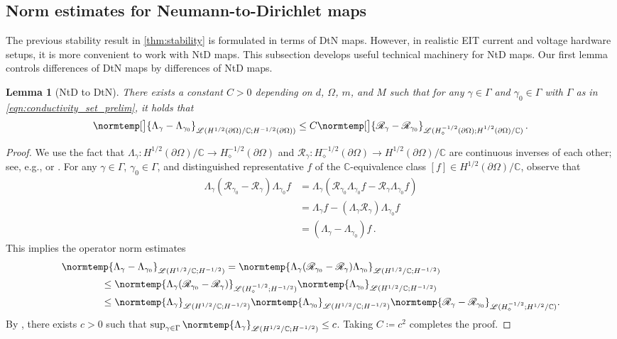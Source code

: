 \documentclass[pdflatex,sn-mathphys-num]{sn-jnl-preprint}
\newcommand{\C}{\mathbb{C}}
\newcommand{\sL}{\mathscr{L}}
\newcommand{\pOmega}{{\partial\Omega}}
\newcommand{\dtn}{\Lambda_{\gamma}}
\newcommand{\dtnz}{\Lambda_{\gamma_0}}
\newcommand{\ntd}{\mathscr{R}_{\gamma}}
\newcommand{\ntdz}{\mathscr{R}_{\gamma_0}}
\newcommand{\norm}{\normtemp}
\newcommand{\defeq}{\coloneqq} %
\theoremstyle{thmstyleone}%
\newtheorem{lemma}[theorem]{Lemma}%
\theoremstyle{thmstyletwo}%
\theoremstyle{thmstylethree}%
\numberwithin{equation}{section}
\numberwithin{theorem}{section}
\begin{document}
\subsection{Norm estimates for Neumann-to-Dirichlet maps}\label{sec:extend_bounds}
The previous stability result in \cref{thm:stability} is formulated in terms of DtN maps. However, in realistic EIT current and voltage hardware setups, it is more convenient to work with NtD maps. This subsection develops useful technical machinery for NtD maps. Our first lemma controls differences of DtN maps by differences of NtD maps.
\begin{lemma}[NtD to DtN]\label{lem:ntd_to_dtn}
    There exists a constant $C>0$ depending on $d$, $\Omega$, $m$, and $M$ such that for any $\gamma\in\Gamma$ and $\gamma_0\in \Gamma$ with $\Gamma$ as in \eqref{eqn:conductivity_set_prelim}, it holds that
    \begin{align}\label{eqn:ntd_to_dtn}
         \norm[\big]{\dtn - \dtnz}_{\sL(H^{1/2}(\pOmega)/\C;H^{-1/2}(\pOmega))} \leq C \norm[\big]{\ntd-\ntdz}_{\sL(H^{-1/2}_\diamond(\pOmega);H_{\phantom{\diamond}}^{1/2}(\pOmega)/\C)}\,.
    \end{align}
\end{lemma}
\begin{proof}
    We use the fact that $\dtn\colon H^{1/2}(\pOmega)/\C\to H_{\diamond}^{-1/2}(\pOmega)$ and $\ntd\colon H_{\diamond}^{-1/2}(\pOmega)\to H^{1/2}(\pOmega)/\C$ are continuous inverses of each other; see, e.g., \cite[Sec.~12.3.2, pp.~164--165]{mueller2012linear} or \cite[Lemma~20, p.~197]{abraham2019statistical}.
    For any $\gamma\in\Gamma$, $\gamma_0\in\Gamma$, and distinguished representative $f$ of the $\C$-equivalence class $[f] \in H^{1/2}(\pOmega)/\C$, observe that
    \begin{align*}
        \dtn(\ntdz - \ntd)\dtnz f &= \dtn (\ntdz \dtnz f - \ntd\dtnz f)\\
        &=\dtn f - (\dtn\ntd)\dtnz f\\
        &=(\dtn - \dtnz)f\,.
    \end{align*}
    This implies the operator norm estimates
    \begin{align*}
        &\norm{\Lambda_{\gamma} - \Lambda_{\gamma_0}}_{\sL(H^{1/2}/\C;H^{-1/2})} = \norm{\dtn(\ntdz - \ntd)\dtnz}_{\sL(H^{1/2}/\C;H^{-1/2})}\\
        &\qquad\quad\quad\leq \norm{\dtn(\ntdz - \ntd)}_{\sL({H}_\diamond^{-1/2};H^{-1/2})}\norm{\dtnz}_{\sL(H^{1/2}/\C;H^{-1/2})}\\
        &\qquad\quad\quad\leq \norm{\dtn}_{\sL(H^{1/2}/\C;H^{-1/2})}\norm{\dtnz}_{\sL(H^{1/2}/\C;H^{-1/2})}\norm{\ntd - \ntdz}_{\sL({H}_\diamond^{-1/2};H^{1/2}/\C)}.
    \end{align*}
    By , there exists $c>0$ such that $\sup_{\gamma\in\Gamma} \norm{\dtn}_{\sL(H^{1/2}/\C;H^{-1/2})}\leq c$. Taking $C\defeq c^2$ completes the proof.
\end{proof}
\end{document}
